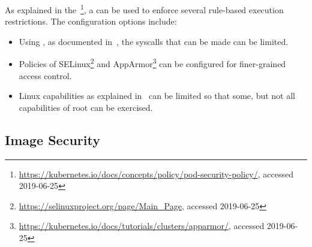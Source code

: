 As explained in the~\textcite{k8sdocs}\footnote{\url{https://kubernetes.io/docs/concepts/policy/pod-security-policy/}, accessed 2019-06-25}, a  can be used to enforce several rule-based execution restrictions. The configuration options include:

\begin{itemize}
    \item Using , as documented in~\textcite{seccompMan}, the syscalls that can be made can be limited. 
    \item Policies of SELinux\footnote{\url{https://selinuxproject.org/page/Main_Page}, accessed 2019-06-25} and AppArmor\footnote{\url{https://kubernetes.io/docs/tutorials/clusters/apparmor/}, accessed 2019-06-25} can be configured for finer-grained access control. 
    \item Linux capabilities as explained in~\textcite{linuxCaps} can be limited so that some, but not all capabilities of root can be exercised. 
\end{itemize}

\subsection{Image Security}



